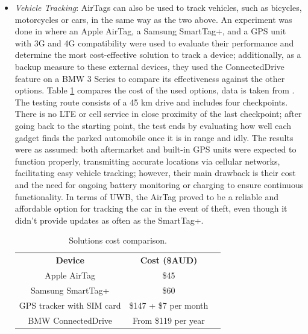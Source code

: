 \documentclass[english]{article}
\begin{document}
\begin{itemize}
  \item \textit{Vehicle Tracking}: AirTags can also be used to track vehicles, such as bicycles, motorcycles or cars, in the same way as the two above. An experiment was done in \cite{Maric2023} where an Apple AirTag, a Samsung SmartTag+, and a GPS unit with 3G and 4G compatibility were used to evaluate their performance and determine the most cost-effective solution to track a device; additionally, as a backup measure to these external devices, they used the ConnectedDrive feature on a BMW 3 Series to compare its effectiveness against the other options. Table \ref{vehicles} compares the cost of the used options, data is taken from \cite{Maric2023}. The testing route consists of a 45 km drive and includes four checkpoints. There is no LTE or cell service in close proximity of the last checkpoint; after going back to the starting point, the test ends by evaluating how well each gadget finds the parked automobile once it is in range and idly. The results were as assumed: both aftermarket and built-in GPS units were expected to function properly, transmitting accurate locations via cellular networks, facilitating easy vehicle tracking; however, their main drawback is their cost and the need for ongoing battery monitoring or charging to ensure continuous functionality. In terms of UWB, the AirTag proved to be a reliable and affordable option for tracking the car in the event of theft, even though it didn't provide updates as often as the SmartTag+.
  \begin{table}[h] 
    \caption{Solutions cost comparison.}
      \centering
      \begin{tabular}{|c|c|c}
        \cline{1-2}
        \textbf{Device}           & \textbf{Cost (\$AUD)}  &  \\ \cline{1-2}
        Apple AirTag              & \$45                   &  \\ \cline{1-2}
        Samsung SmartTag+         & \$60                   &  \\ \cline{1-2}
        GPS tracker with SIM card & \$147 + \$7 per month &  \\ \cline{1-2}
        BMW ConnectedDrive        & From \$119 per year    &  \\ \cline{1-2}
        \end{tabular}
        \label{vehicles}
      \end{table}


\end{itemize}
\end{document}
